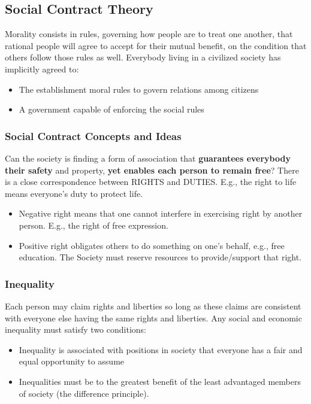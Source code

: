 \documentclass{article}
\begin{document}
\subsection{Social Contract Theory}
\begin{flushleft}
Morality consists in rules, governing how people are to treat one another, that rational people will agree to accept for their mutual benefit, on the condition that others follow those rules as well. Everybody living in a civilized society has implicitly agreed to:
\begin{itemize}
  \item The establishment moral rules to govern relations among citizens 
  \item A government capable of enforcing the social rules
\end{itemize}
\end{flushleft}

\subsubsection{Social Contract Concepts and Ideas}
\begin{flushleft}
Can the society is finding a form of association that \textbf{guarantees everybody their safety} and property, \textbf{yet enables each person to remain free}? There is a close correspondence between RIGHTS and DUTIES. E.g., the right to life means everyone’s duty to protect life.
\begin{itemize}
  \item Negative right means that one cannot interfere in exercising right by another person. E.g., the right of free expression.
  \item Positive right obligates others to do something on one’s behalf, e.g., free education. The Society must reserve resources to provide/support that right.
\end{itemize}
\end{flushleft}

\subsubsection{Inequality}
Each person may claim rights and liberties so long as these claims are consistent with everyone else having the same rights and liberties. Any social and economic inequality must satisfy two conditions:
\begin{itemize}
  \item Inequality is associated with positions in society that everyone has a fair and equal opportunity to assume
  \item Inequalities must be to the greatest benefit of the least advantaged members of society (the difference principle).
\end{itemize}
\end{document}
